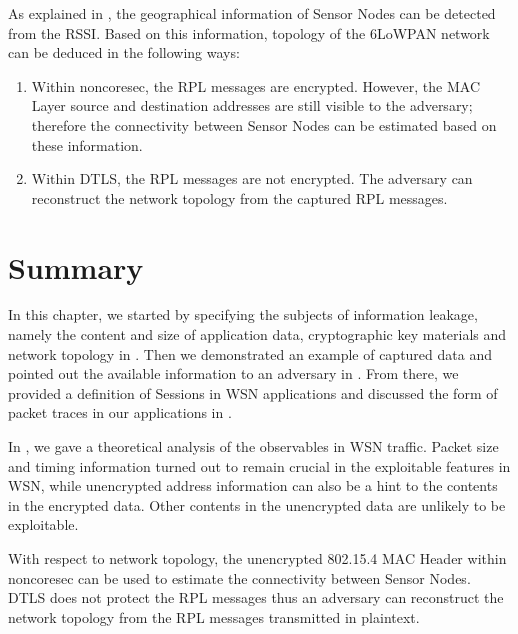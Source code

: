 As explained in , the geographical information of Sensor Nodes can be detected from the RSSI. Based on this information, topology of the 6LoWPAN network can be deduced in the following ways:

\begin{enumerate}
	\item Within noncoresec, the RPL messages are encrypted. However, the MAC Layer source and destination addresses are still visible to the adversary; therefore the connectivity between Sensor Nodes can be estimated based on these information.
	\item Within DTLS, the RPL messages are not encrypted. The adversary can reconstruct the network topology from the captured RPL messages.
\end{enumerate}

\section{Summary}

In this chapter, we started by specifying the subjects of information leakage, namely the content and size of application data, cryptographic key materials and network topology in . Then we demonstrated an example of captured data and pointed out the available information to an adversary in . From there, we provided a definition of Sessions in WSN applications and discussed the form of packet traces in our applications in .

In , we gave a theoretical analysis of the observables in WSN traffic. Packet size and timing information turned out to remain crucial in the  exploitable features in WSN, while unencrypted address information can also be a hint to the contents in the encrypted data. Other contents in the unencrypted data are unlikely to be exploitable.

With respect to network topology, the unencrypted 802.15.4 MAC Header within noncoresec can be used to estimate the connectivity between Sensor Nodes. DTLS does not protect the RPL messages thus an adversary can reconstruct the network topology from the RPL messages transmitted in plaintext.